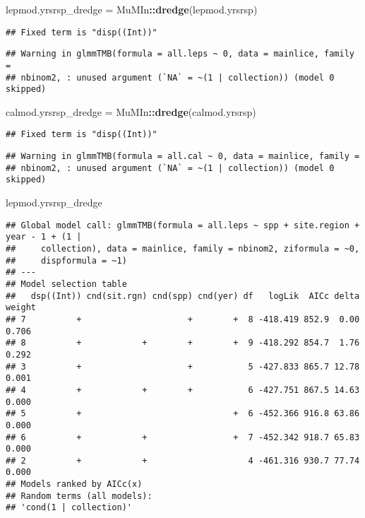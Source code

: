 \documentclass[]{article}
\newenvironment{Shaded}{\begin{snugshade}}{\end{snugshade}}
\newcommand{\KeywordTok}[1]{\textcolor[rgb]{0.13,0.29,0.53}{\textbf{#1}}}
\newcommand{\StringTok}[1]{\textcolor[rgb]{0.31,0.60,0.02}{#1}}
\newcommand{\OperatorTok}[1]{\textcolor[rgb]{0.81,0.36,0.00}{\textbf{#1}}}
\newcommand{\NormalTok}[1]{#1}
\begin{document}
\begin{Shaded}
\begin{Highlighting}[]
\NormalTok{lepmod.yrsrsp_dredge =}\StringTok{ }\NormalTok{MuMIn}\OperatorTok{::}\KeywordTok{dredge}\NormalTok{(lepmod.yrsrsp)}
\end{Highlighting}
\end{Shaded}

\begin{verbatim}
## Fixed term is "disp((Int))"
\end{verbatim}

\begin{verbatim}
## Warning in glmmTMB(formula = all.leps ~ 0, data = mainlice, family =
## nbinom2, : unused argument (`NA` = ~(1 | collection)) (model 0 skipped)
\end{verbatim}

\begin{Shaded}
\begin{Highlighting}[]
\NormalTok{calmod.yrsrsp_dredge =}\StringTok{ }\NormalTok{MuMIn}\OperatorTok{::}\KeywordTok{dredge}\NormalTok{(calmod.yrsrsp)}
\end{Highlighting}
\end{Shaded}

\begin{verbatim}
## Fixed term is "disp((Int))"
\end{verbatim}

\begin{verbatim}
## Warning in glmmTMB(formula = all.cal ~ 0, data = mainlice, family =
## nbinom2, : unused argument (`NA` = ~(1 | collection)) (model 0 skipped)
\end{verbatim}

\begin{Shaded}
\begin{Highlighting}[]
\NormalTok{lepmod.yrsrsp_dredge}
\end{Highlighting}
\end{Shaded}

\begin{verbatim}
## Global model call: glmmTMB(formula = all.leps ~ spp + site.region + year - 1 + (1 | 
##     collection), data = mainlice, family = nbinom2, ziformula = ~0, 
##     dispformula = ~1)
## ---
## Model selection table 
##   dsp((Int)) cnd(sit.rgn) cnd(spp) cnd(yer) df   logLik  AICc delta weight
## 7          +                     +        +  8 -418.419 852.9  0.00  0.706
## 8          +            +        +        +  9 -418.292 854.7  1.76  0.292
## 3          +                     +           5 -427.833 865.7 12.78  0.001
## 4          +            +        +           6 -427.751 867.5 14.63  0.000
## 5          +                              +  6 -452.366 916.8 63.86  0.000
## 6          +            +                 +  7 -452.342 918.7 65.83  0.000
## 2          +            +                    4 -461.316 930.7 77.74  0.000
## Models ranked by AICc(x) 
## Random terms (all models): 
## 'cond(1 | collection)'
\end{verbatim}
\end{document}
